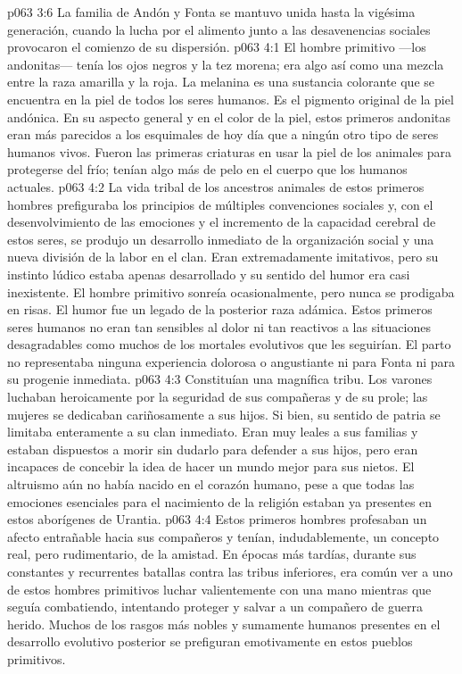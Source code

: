 \vs p063 3:6 \pc La familia de Andón y Fonta se mantuvo unida hasta la vigésima generación, cuando la lucha por el alimento junto a las desavenencias sociales provocaron el comienzo de su dispersión.
\vs p063 4:1 El hombre primitivo ---los andonitas--- tenía los ojos negros y la tez morena; era algo así como una mezcla entre la raza amarilla y la roja. La melanina es una sustancia colorante que se encuentra en la piel de todos los seres humanos. Es el pigmento original de la piel andónica. En su aspecto general y en el color de la piel, estos primeros andonitas eran más parecidos a los esquimales de hoy día que a ningún otro tipo de seres humanos vivos. Fueron las primeras criaturas en usar la piel de los animales para protegerse del frío; tenían algo más de pelo en el cuerpo que los humanos actuales.
\vs p063 4:2 La vida tribal de los ancestros animales de estos primeros hombres prefiguraba los principios de múltiples convenciones sociales y, con el desenvolvimiento de las emociones y el incremento de la capacidad cerebral de estos seres, se produjo un desarrollo inmediato de la organización social y una nueva división de la labor en el clan. Eran extremadamente imitativos, pero su instinto lúdico estaba apenas desarrollado y su sentido del humor era casi inexistente. El hombre primitivo sonreía ocasionalmente, pero nunca se prodigaba en risas. El humor fue un legado de la posterior raza adámica. Estos primeros seres humanos no eran tan sensibles al dolor ni tan reactivos a las situaciones desagradables como muchos de los mortales evolutivos que les seguirían. El parto no representaba ninguna experiencia dolorosa o angustiante ni para Fonta ni para su progenie inmediata.
\vs p063 4:3 \pc Constituían una magnífica tribu. Los varones luchaban heroicamente por la seguridad de sus compañeras y de su prole; las mujeres se dedicaban cariñosamente a sus hijos. Si bien, su sentido de patria se limitaba enteramente a su clan inmediato. Eran muy leales a sus familias y estaban dispuestos a morir sin dudarlo para defender a sus hijos, pero eran incapaces de concebir la idea de hacer un mundo mejor para sus nietos. El altruismo aún no había nacido en el corazón humano, pese a que todas las emociones esenciales para el nacimiento de la religión estaban ya presentes en estos aborígenes de Urantia.
\vs p063 4:4 Estos primeros hombres profesaban un afecto entrañable hacia sus compañeros y tenían, indudablemente, un concepto real, pero rudimentario, de la amistad. En épocas más tardías, durante sus constantes y recurrentes batallas contra las tribus inferiores, era común ver a uno de estos hombres primitivos luchar valientemente con una mano mientras que seguía combatiendo, intentando proteger y salvar a un compañero de guerra herido. Muchos de los rasgos más nobles y sumamente humanos presentes en el desarrollo evolutivo posterior se prefiguran emotivamente en estos pueblos primitivos.
